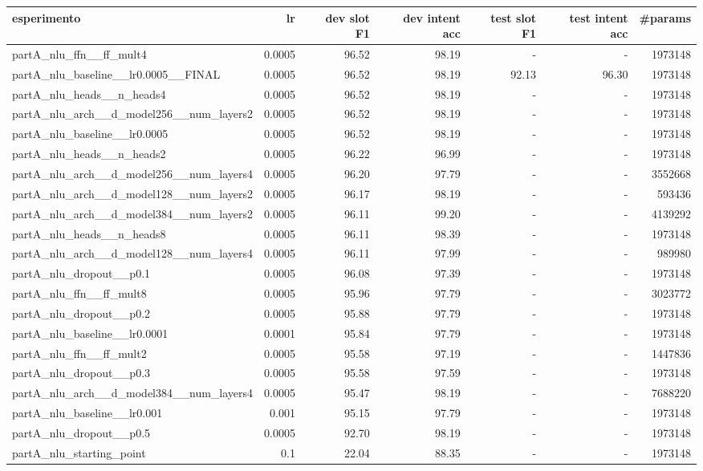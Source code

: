 \begin{tabular}{lrrrrrr}
\toprule
esperimento & lr & dev slot F1 & dev intent acc & test slot F1 & test intent acc & \#params \\
\midrule
partA\_nlu\_ffn\_\_ff\_mult4 & 0.0005 & 96.52 & 98.19 & - & - & 1973148 \\
partA\_nlu\_baseline\_\_lr0.0005\_\_FINAL & 0.0005 & 96.52 & 98.19 & 92.13 & 96.30 & 1973148 \\
partA\_nlu\_heads\_\_n\_heads4 & 0.0005 & 96.52 & 98.19 & - & - & 1973148 \\
partA\_nlu\_arch\_\_d\_model256\_\_num\_layers2 & 0.0005 & 96.52 & 98.19 & - & - & 1973148 \\
partA\_nlu\_baseline\_\_lr0.0005 & 0.0005 & 96.52 & 98.19 & - & - & 1973148 \\
partA\_nlu\_heads\_\_n\_heads2 & 0.0005 & 96.22 & 96.99 & - & - & 1973148 \\
partA\_nlu\_arch\_\_d\_model256\_\_num\_layers4 & 0.0005 & 96.20 & 97.79 & - & - & 3552668 \\
partA\_nlu\_arch\_\_d\_model128\_\_num\_layers2 & 0.0005 & 96.17 & 98.19 & - & - & 593436 \\
partA\_nlu\_arch\_\_d\_model384\_\_num\_layers2 & 0.0005 & 96.11 & 99.20 & - & - & 4139292 \\
partA\_nlu\_heads\_\_n\_heads8 & 0.0005 & 96.11 & 98.39 & - & - & 1973148 \\
partA\_nlu\_arch\_\_d\_model128\_\_num\_layers4 & 0.0005 & 96.11 & 97.99 & - & - & 989980 \\
partA\_nlu\_dropout\_\_p0.1 & 0.0005 & 96.08 & 97.39 & - & - & 1973148 \\
partA\_nlu\_ffn\_\_ff\_mult8 & 0.0005 & 95.96 & 97.79 & - & - & 3023772 \\
partA\_nlu\_dropout\_\_p0.2 & 0.0005 & 95.88 & 97.79 & - & - & 1973148 \\
partA\_nlu\_baseline\_\_lr0.0001 & 0.0001 & 95.84 & 97.79 & - & - & 1973148 \\
partA\_nlu\_ffn\_\_ff\_mult2 & 0.0005 & 95.58 & 97.19 & - & - & 1447836 \\
partA\_nlu\_dropout\_\_p0.3 & 0.0005 & 95.58 & 97.59 & - & - & 1973148 \\
partA\_nlu\_arch\_\_d\_model384\_\_num\_layers4 & 0.0005 & 95.47 & 98.19 & - & - & 7688220 \\
partA\_nlu\_baseline\_\_lr0.001 & 0.001 & 95.15 & 97.79 & - & - & 1973148 \\
partA\_nlu\_dropout\_\_p0.5 & 0.0005 & 92.70 & 98.19 & - & - & 1973148 \\
partA\_nlu\_starting\_point & 0.1 & 22.04 & 88.35 & - & - & 1973148 \\
\bottomrule
\end{tabular}